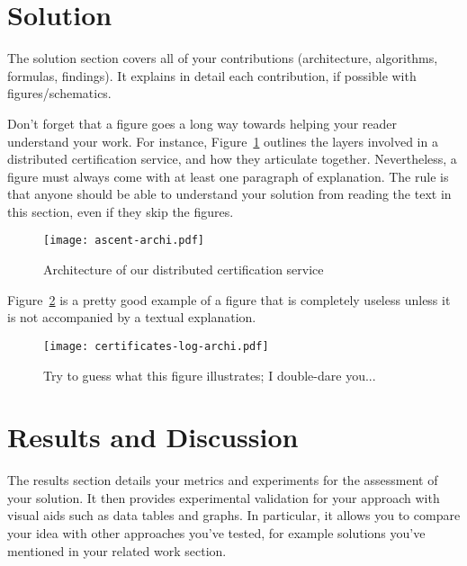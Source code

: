 \documentclass{scrartcl}
\begin{document}
\section{Solution}

The solution section covers all of your contributions (architecture, algorithms, formulas, findings).
It explains in detail each contribution, if possible with figures/schematics.

Don't forget that a figure goes a long way towards helping your reader understand your work. For instance, Figure~\ref{fig:ascent} outlines the layers involved in a distributed certification service, and how they articulate together. Nevertheless, a figure must always come with at least one paragraph of explanation. The rule is that anyone should be able to understand your solution from reading the text in this section, even if they skip the figures.

\begin{figure}[H]
	\begin{center}
		\texttt{[image: ascent-archi.pdf]}
	\end{center}
	\caption{Architecture of our distributed certification service}
	\label{fig:ascent}
\end{figure}

Figure~\ref{fig:log-archi} is a pretty good example of a figure that is completely useless unless it is not accompanied by a textual explanation.

\begin{figure}
	\begin{center}
		\texttt{[image: certificates-log-archi.pdf]}
	\end{center}
	\caption{Try to guess what this figure illustrates; I double-dare you...}
	\label{fig:log-archi}
\end{figure}



\section{Results and Discussion}

The results section details your metrics and experiments for the assessment of your solution. It then provides experimental validation for your approach with visual aids such as data tables and graphs. In particular, it allows you to compare your idea with other approaches you've tested, for example solutions you've mentioned in your related work section.
\end{document}
